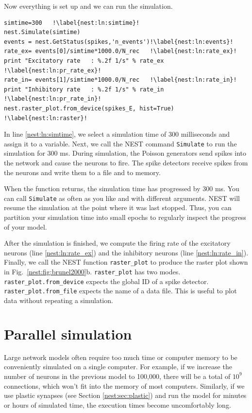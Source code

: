 \documentclass{article}
\begin{document}
Now everything is set up and we can run the simulation.

\begin{lstlisting}[name=Brunel_interactive]
simtime=300   !\label{nest:ln:simtime}!
nest.Simulate(simtime)
events = nest.GetStatus(spikes,'n_events')!\label{nest:ln:events}!
rate_ex= events[0]/simtime*1000.0/N_rec   !\label{nest:ln:rate_ex}!
print "Excitatory rate   : %.2f 1/s" % rate_ex !\label{nest:ln:pr_rate_ex}!
rate_in= events[1]/simtime*1000.0/N_rec   !\label{nest:ln:rate_in}!
print "Inhibitory rate   : %.2f 1/s" % rate_in !\label{nest:ln:pr_rate_in}!
nest.raster_plot.from_device(spikes_E, hist=True)  !\label{nest:ln:raster}!
\end{lstlisting}
In line \ref{nest:ln:simtime}, we select a simulation time of
300 milliseconds and assign it to a variable. Next, we call the NEST
command \lstinline!Simulate! to run the simulation for 300 ms. During
simulation, the Poisson generators send spikes into the network
and cause the neurons to fire. The spike detectors receive spikes
from the neurons and write them to a file and to memory.

When the function returns, the simulation time has progressed by
300 ms. You can call \lstinline!Simulate! as often as you like and
with different arguments. NEST will resume the simulation at the point
where it was last stopped. Thus, you can partition your simulation time
into small epochs to regularly inspect the progress of your model.

After the simulation is finished, we compute the firing rate of the
excitatory neurons (line \ref{nest:ln:rate_ex}) and the inhibitory
neurons (line \ref{nest:ln:rate_in}). Finally, we call the NEST
function \lstinline!raster_plot! to produce the raster plot shown in
Fig.~\ref{nest:fig:brunel2000}b. \lstinline!raster_plot! has two
modes. \lstinline!raster_plot.from_device! expects the global ID of a
spike detector.  \lstinline!raster_plot.from_file! expects the name of
a data file. This is useful to plot data without repeating a
simulation.


\section{Parallel simulation}\label{nest:sec:parallel}

Large network models often require too much time or computer memory to
be conveniently simulated on a single computer. For example, if we increase the number of
neurons in the previous model to 100,000, there will be a total of
$10^9$ connections, which won't fit into the memory of most computers.
Similarly, if we use plastic synapses (see Section
\ref{nest:sec:plastic}) and run the model for minutes or hours of
simulated time, the execution times become uncomfortably long.
 
\end{document}
